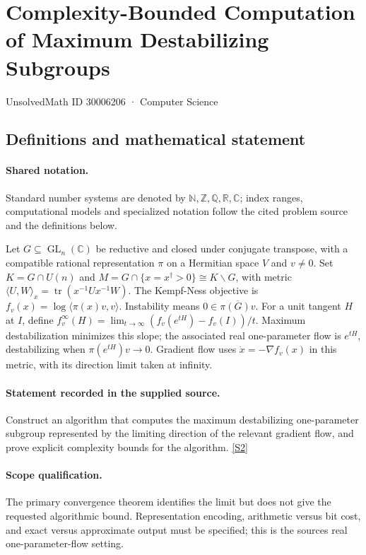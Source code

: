 \documentclass[11pt]{article}
\newcommand{\sref}[2]{\hyperlink{source:#1:#2}{[S#2]}}
\begin{document}
\setcounter{section}{30006205}
\section{Complexity-Bounded Computation of Maximum Destabilizing Subgroups}\label{30006206}
{\small\sffamily UnsolvedMath ID 30006206 · Computer Science}
\subsection{Definitions and mathematical statement}

\paragraph{Shared notation.}Standard number systems are denoted by $\mathbb N,\mathbb Z,\mathbb Q,\mathbb R,\mathbb C$; index ranges, computational models and specialized notation follow the cited problem source and the definitions below.


Let $G\subseteq\operatorname{GL}_n(\mathbb C)$ be reductive and closed under conjugate transpose, with a compatible rational representation $\pi$ on a Hermitian space $V$ and $v\ne0$. Set $K=G\cap U(n)$ and $M=G\cap\{x=x^\dagger>0\}\cong K\backslash G$, with metric $\langle U,W\rangle_x=\operatorname{tr}(x^{-1}Ux^{-1}W)$. The Kempf-Ness objective is $f_v(x)=\log\langle\pi(x)v,v\rangle$. Instability means $0\in\overline{\pi(G)v}$. For a unit tangent $H$ at $I$, define $f_v^\infty(H)=\lim_{t\to\infty}(f_v(e^{tH})-f_v(I))/t$. Maximum destabilization minimizes this slope; the associated real one-parameter flow is $e^{tH}$, destabilizing when $\pi(e^{tH})v\to0$. Gradient flow uses $\dot x=-\nabla f_v(x)$ in this metric, with its direction limit taken at infinity.
\paragraph{Statement recorded in the supplied source.}
Construct an algorithm that computes the maximum destabilizing one-parameter subgroup represented by the limiting direction of the relevant gradient flow, and prove explicit complexity bounds for the algorithm. \sref{30006206}{2}
\paragraph{Scope qualification.}
The primary convergence theorem identifies the limit but does not give the requested algorithmic bound. Representation encoding, arithmetic versus bit cost, and exact versus approximate output must be specified; this is the source\textquotesingle s real one-parameter-flow setting.
\end{document}
